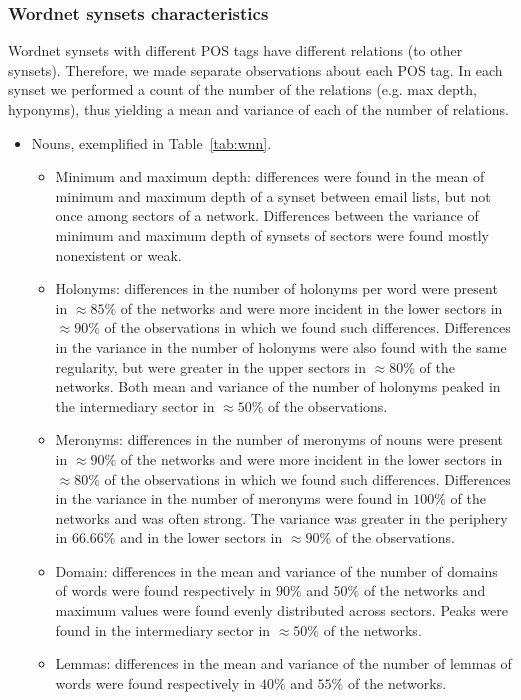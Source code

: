 \documentclass[review]{elsarticle}
\begin{document}
\subsubsection{Wordnet synsets characteristics}\label{subsec:wn1}
Wordnet synsets with different POS tags have different relations (to other synsets).
Therefore, we made separate observations about each POS tag.
In each synset we performed a count of the number of the relations (e.g. max depth, hyponyms),
thus yielding a mean and variance of each of the number of relations.
\begin{itemize}
\item Nouns, exemplified in Table~\ref{tab:wnn}.
\begin{itemize}
\item Minimum and maximum depth: 
differences were found in the mean of minimum and maximum depth of a synset between email lists,
but not once among sectors of a network.
Differences between the variance of minimum and maximum depth of synsets of sectors were found mostly nonexistent or weak.
\item Holonyms:
differences in the number of holonyms per word were present in $\approx 85\%$ of the networks and were
more incident in the lower sectors in $\approx 90\%$ of the observations in which we found such differences.
Differences in the variance in the number of holonyms were also found with the same regularity,
but were greater in the upper sectors in $\approx 80\%$ of the networks.
Both mean and variance of the number of holonyms peaked in the intermediary sector in $\approx50\%$ of the observations.
\item Meronyms:
differences in the number of meronyms of nouns were present in $\approx 90\%$ of the networks and were
more incident in the lower sectors in $\approx 80\%$ of the observations in which we found such differences.
Differences in the variance in the number of meronyms were found in $100\%$ of the networks and was often strong.
The variance was greater in the periphery in $66.66\%$ and in the lower sectors in $\approx 90\%$ of the observations.
\item Domain:
differences in the mean and variance of the number of domains of words were found respectively in $90\%$ and $50\%$ of the networks and maximum values were found evenly distributed across sectors.
Peaks were found in the intermediary sector in $\approx 50\%$ of the networks.
\item Lemmas:
differences in the mean and variance of the number of lemmas of words were found respectively in $40\%$ and $55\%$ of the networks.

\end{itemize}
\end{itemize}
\end{document}
